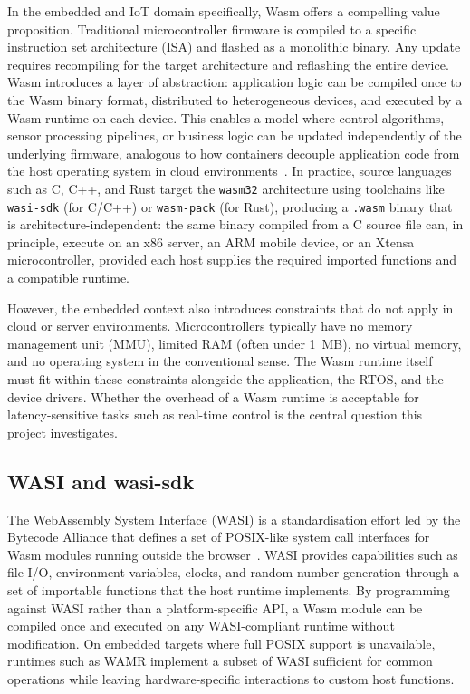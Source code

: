 \documentclass[12pt, a4paper]{report}
\begin{document}
In the embedded and IoT domain specifically, Wasm offers a compelling value proposition.
Traditional microcontroller firmware is compiled to a specific instruction set architecture
(ISA) and flashed as a monolithic binary. Any update requires recompiling for the target
architecture and reflashing the entire device. Wasm introduces a layer of abstraction:
application logic can be compiled once to the Wasm binary format, distributed to
heterogeneous devices, and executed by a Wasm runtime on each device. This enables a model
where control algorithms, sensor processing pipelines, or business logic can be updated
independently of the underlying firmware, analogous to how containers decouple application
code from the host operating system in cloud
environments~\cite{menetrey2022twine, li2022wasm-iot}. In practice, source languages such
as C, C++, and Rust target the \texttt{wasm32} architecture using toolchains like
\texttt{wasi-sdk} (for C/C++) or \texttt{wasm-pack} (for Rust), producing a
\texttt{.wasm} binary that is architecture-independent: the same binary compiled from a C
source file can, in principle, execute on an x86 server, an ARM mobile device, or an Xtensa
microcontroller, provided each host supplies the required imported functions and a
compatible runtime.

However, the embedded context also introduces constraints that do not apply in cloud or server environments. Microcontrollers typically have no memory management unit (MMU), limited RAM (often under 1~MB), no virtual memory, and no operating system in the conventional sense. The Wasm runtime itself must fit within these constraints alongside the application, the RTOS, and the device drivers. Whether the overhead of a Wasm runtime is acceptable for latency-sensitive tasks such as real-time control is the central question this project investigates. 


\subsection{WASI and wasi-sdk}
\label{subsec:wasi-sdk}

The WebAssembly System Interface (WASI) is a standardisation effort led by the Bytecode
Alliance that defines a set of POSIX-like system call interfaces for Wasm modules running
outside the browser~\cite{wasi-spec}. WASI provides capabilities such as file I/O,
environment variables, clocks, and random number generation through a set of importable
functions that the host runtime implements. By programming against WASI rather than a
platform-specific API, a Wasm module can be compiled once and executed on any
WASI-compliant runtime without modification. On embedded targets where full POSIX support is
unavailable, runtimes such as WAMR implement a subset of WASI sufficient for common
operations while leaving hardware-specific interactions to custom host functions.
\end{document}
